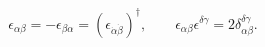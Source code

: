 \begin{equation}
\epsilon_{\alpha\beta} = -\epsilon_{\beta\alpha} = 
(\epsilon_{\dot\alpha \dot\beta})^\dagger, \qquad 
\epsilon_{\alpha\beta}\epsilon^{\delta\gamma} = 
2 \delta^{\delta\gamma}_{\alpha\beta}.
\end{equation}

